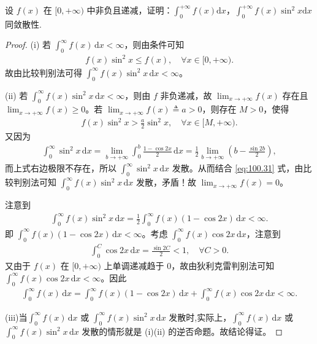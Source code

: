 \documentclass[../../main.tex]{subfiles}
\begin{document}
\begin{example}
设 \(f(x)\) 在 \([0,+\infty)\) 中非负且递减，证明：\(\int_{0}^{+\infty} f(x) \mathrm{d}x\)，\(\int_{0}^{+\infty} f(x)\sin^{2}x \mathrm{d}x\) 同敛散性. 
\end{example}
\begin{proof}
(i) 若 \(\int_0^\infty f(x) \, \mathrm{d}x < \infty\)，则由条件可知
\begin{align*}
f(x) \sin^2 x \leqslant f(x), \quad \forall x \in [0, +\infty).
\end{align*}
故由比较判别法可得 \(\int_0^\infty f(x) \sin^2 x \, \mathrm{d}x < \infty\)。

(ii) 若 \(\int_0^\infty f(x) \sin^2 x \, \mathrm{d}x < \infty\)，则由 \(f\) 非负递减，故 \(\lim_{x \to +\infty} f(x)\) 存在且 \(\lim_{x \to +\infty} f(x) \geqslant 0\)。若 \(\lim_{x \to +\infty} f(x) \triangleq a > 0\)，则存在 \(M > 0\)，使得
\begin{align}
f(x) \sin^2 x > \frac{a}{2} \sin^2 x, \quad \forall x \in [M, +\infty). \label{eq:100.31}
\end{align}
又因为
\begin{align*}
\int_0^\infty \sin^2 x \, \mathrm{d}x = \lim_{b \to +\infty} \int_0^b \frac{1 - \cos 2x}{2} \, \mathrm{d}x = \frac{1}{2} \lim_{b \to +\infty} \left( b - \frac{\sin 2b}{2} \right),
\end{align*}
而上式右边极限不存在，所以 \(\int_0^\infty \sin^2 x \, \mathrm{d}x\) 发散。从而结合 \eqref{eq:100.31} 式，由比较判别法可知 \(\int_0^\infty f(x) \sin^2 x \, \mathrm{d}x\) 发散，矛盾！故 \(\lim_{x \to +\infty} f(x) = 0\)。

注意到
\begin{align*}
\int_0^\infty f(x) \sin^2 x \, \mathrm{d}x = \frac{1}{2} \int_0^\infty f(x) (1 - \cos 2x) \, \mathrm{d}x < \infty.
\end{align*}
即 \(\int_0^\infty f(x) (1 - \cos 2x) \, \mathrm{d}x < \infty\)。考虑 \(\int_0^\infty f(x) \cos 2x \, \mathrm{d}x\)，注意到
\begin{align*}
\int_0^C \cos 2x \, \mathrm{d}x = \frac{\sin 2C}{2} < 1, \quad \forall C > 0.
\end{align*}
又由于 \(f(x)\) 在 \([0, +\infty)\) 上单调递减趋于 0，故由狄利克雷判别法可知 \(\int_0^\infty f(x) \cos 2x \, \mathrm{d}x < \infty\)。因此
\begin{align*}
\int_0^\infty f(x) \, \mathrm{d}x = \int_0^\infty f(x) (1 - \cos 2x) \, \mathrm{d}x + \int_0^\infty f(x) \cos 2x \, \mathrm{d}x < \infty.
\end{align*}

(iii)当\(\int_0^\infty f(x) \, \mathrm{d}x\) 或 \(\int_0^\infty f(x) \sin^2 x \, \mathrm{d}x\) 发散时,实际上，\(\int_0^\infty f(x) \, \mathrm{d}x\) 或 \(\int_0^\infty f(x) \sin^2 x \, \mathrm{d}x\) 发散的情形就是 (i)(ii) 的逆否命题。故结论得证。

\end{proof}
\end{document}
